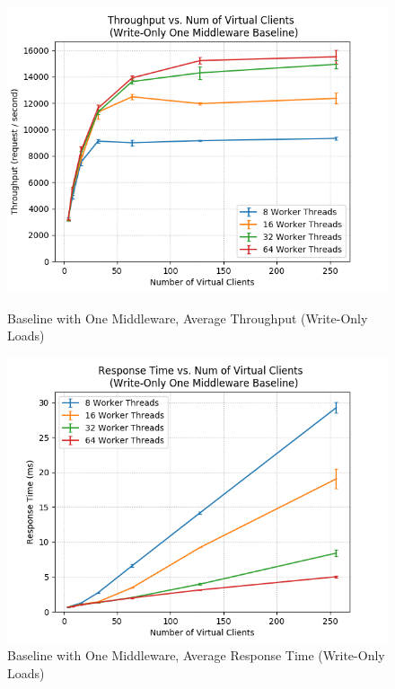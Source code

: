 \documentclass[11pt,a4paper]{article}
\begin{document}
\begin{figure}[H]
	\captionsetup{font=scriptsize,labelfont=scriptsize,justification=centering}
	\centering
	\begin{minipage}{0.5\textwidth}
		\centering
		\includegraphics[scale=0.525]{images/3a_one-mw_w-o_tps.png}
		\caption{{Baseline with One Middleware, Average Throughput (Write-Only Loads)}}
	\end{minipage}\hfill
	\begin{minipage}{0.5\textwidth}
		\centering
		\includegraphics[scale=0.525]{images/3a_one-mw_w-o_rt.png}
		\caption{{Baseline with One Middleware, Average Response Time (Write-Only Loads)}}
	\end{minipage}
\end{figure}
\end{document}
